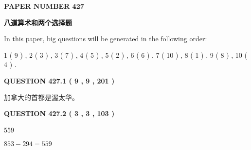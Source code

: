 \documentclass{ctexart}
\begin{document}
   
   
   
\newpage 
\setcounter{page}{ 
   427001 } 
   
   
   
   
 {\textbf{ \Large{ PAPER NUMBER  427  }}}
   
   
\vspace{0.2in}
   
   
   
   
   
   
 \vspace{0.2in}
{\LARGE {\textbf{ 八道算术和两个选择题}}}
   
   
   
\vspace{0.2in}
   
In this paper, big questions will be generated in the following order: 
   
   
   1 ( 9 )
 ,
   2 ( 3 )
 ,
   3 ( 7 )
 ,
   4 ( 5 )
 ,
   5 ( 2 )
 ,
   6 ( 6 )
 ,
   7 ( 10 )
 ,
   8 ( 1 )
 ,
   9 ( 8 )
 ,
   10 ( 4 )
 .
  
\vspace{0.2in}
  
{\textbf{\Large{QUESTION
427.1 
 ( 9 , 9 , 201 )
}}}
  
  
 
 
\noindent{}
 
 
加拿大的首都是渥太华。
 
 
 
 
  
\vspace{0.2in}
  
{\textbf{\Large{QUESTION
427.2 
 ( 3 , 3 , 103 )
}}}
  
  
 
 
\noindent{}

559
 
 
 
 
\noindent{}

$ %
853 -  %
294=   %
559$
 
 
  
\vspace{0.2in}
  
\end{document}
